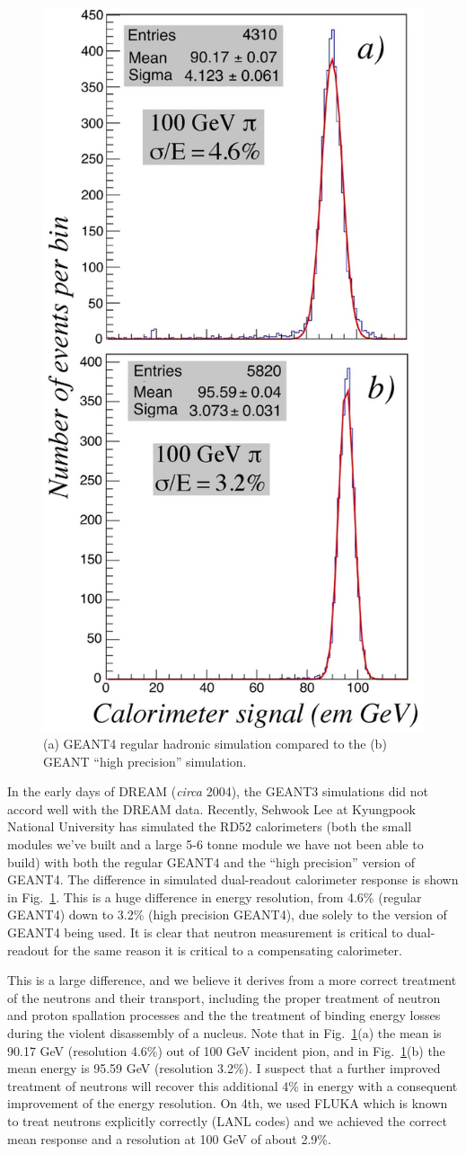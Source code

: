 \begin{figure}
 \centering
 \includegraphics[width=.5\linewidth]{Calorimeter/DualReadout/f41-geant.jpg}
 \caption{(a) GEANT4 regular hadronic simulation compared to the (b) GEANT ``high precision'' simulation.}
 \label{fig:hp}
\end{figure}
In the early days of DREAM ({\it circa} 2004), the GEANT3 simulations did not accord well with the DREAM data.  Recently, Sehwook Lee
at Kyungpook National University has simulated the RD52 calorimeters (both the small modules we've built and a large
5-6 tonne module we have not been able to build) with both the regular GEANT4 and the ``high precision'' version of GEANT4.  The difference in simulated dual-readout calorimeter response is shown in Fig.~\ref{fig:hp}.  This is a huge difference in energy resolution, from 4.6\% (regular GEANT4) down to 3.2\% (high precision GEANT4), due solely to the version of GEANT4 being used. It is clear that neutron measurement is critical to 
dual-readout for the same reason it is critical to a compensating calorimeter.

This is a large difference, and we believe it derives from a more correct treatment of the neutrons and their transport, including the proper treatment of neutron and proton spallation processes and the the treatment of binding energy losses during the violent disassembly of a nucleus.   Note that in  Fig.~\ref{fig:hp}(a) the mean is 90.17 GeV (resolution 4.6\%) out of 100 GeV incident pion, and in Fig.~\ref{fig:hp}(b) the mean energy is 95.59 GeV (resolution 3.2\%). I suspect that a further improved treatment of neutrons will recover this additional 4\% in energy with a consequent improvement of the energy resolution. On 4th, we used FLUKA which is known to treat neutrons explicitly correctly (LANL codes) and we achieved the correct mean response and a resolution at 100 GeV of about 2.9\%.

